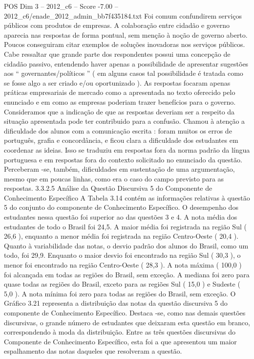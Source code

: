 \begin{textsample}{POS Dim 3 – 2012\_c6 – Score -7.00 – 2012\_c6/enade\_2012\_admin\_bb7f435184.txt}
Foi comum confundirem serviços públicos com produtos de empresas.
A colaboração entre cidadão e governo aparecia nas respostas de forma pontual, sem menção à noção de governo aberto.
Poucos conseguiram citar exemplos de soluções inovadoras nos serviços públicos.
Cabe ressaltar que grande parte dos respondentes possui uma concepção de cidadão passivo, entendendo haver apenas a possibilidade de apresentar sugestões aos “ governantes/políticos ” ( em alguns casos tal possibilidade é tratada como se fosse algo a ser criado e/ou oportunizado ).
As respostas focaram apenas práticas empresariais de mercado como a apresentada no texto oferecido pelo enunciado e em como as empresas poderiam trazer benefícios para o governo.
Consideramos que a indicação de que as respostas deveriam ser a respeito da situação apresentada pode ter contribuido para a confusão.
Chamou à atenção a dificuldade dos alunos com a comunicação escrita : foram muitos os erros de português, grafia e concordância, e ficou clara a dificuldade dos estudantes em coordenar as ideias.
Isso se traduziu em respostas fora da norma padrão da língua portuguesa e em respostas fora do contexto solicitado no enunciado da questão.
Perceberam -se, também, dificuldades em sustentação de uma argumentação, mesmo que em poucas linhas, como era o caso do campo previsto para as respostas. 3.3.2.5 Análise da Questão Discursiva 5 do Componente de Conhecimento Específico A Tabela 3.14 contém as informações relativas à questão 5 do conjunto do componente de Conhecimento Específico.
O desempenho dos estudantes nessa questão foi superior ao das questões 3 e 4.
A nota média dos estudantes de todo o Brasil foi 24,5.
A maior média foi registrada na região Sul ( 26,6 ), enquanto a menor média foi registrada na região Centro-Oeste ( 20,4 ).
Quanto à variabilidade das notas, o desvio padrão dos alunos do Brasil, como um todo, foi 29,9.
Enquanto o maior desvio foi encontrado na região Sul ( 30,3 ), o menor foi encontrado na região Centro-Oeste ( 28,3 ).
A nota máxima ( 100,0 ) foi alcançada em todas as regiões do Brasil, sem exceção.
A mediana foi zero para quase todas as regiões do Brasil, exceto para as regiões Sul ( 15,0 ) e Sudeste ( 5,0 ).
A nota mínima foi zero para todas as regiões do Brasil, sem exceção.
O Gráfico 3.21 representa a distribuição das notas da questão discursiva 5 do componente de Conhecimento Específico.
Destaca -se, como nas demais questões discursivas, o grande número de estudantes que deixaram esta questão em branco, correspondendo à moda da distribuição.
Entre as três questões discursivas do Componente de Conhecimento Específico, esta foi a que apresentou um maior espalhamento das notas daqueles que resolveram a questão.

\end{textsample}
